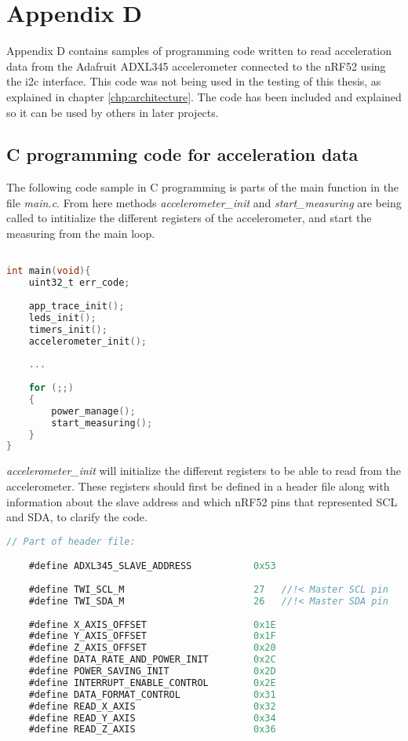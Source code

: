 \chapter{Appendix D}
\label{chp:appendixc}

Appendix D contains samples of programming code written to read acceleration data from the Adafruit ADXL345 accelerometer connected to the nRF52 using the \gls{i2c} interface. This code was not being used in the testing of this thesis, as explained in chapter \ref{chp:architecture}. The code has been included and explained so it can be used by others in later projects.

\section{C programming code for acceleration data}

The following code sample in C programming is parts of the main function in the file \textit{main.c}. From here methods \textit{accelerometer\_init} and \textit{start\_measuring} are being called to intitialize the different registers of the accelerometer, and start the measuring from the main loop. 

\begin{lstlisting}[language=C]

int main(void){
	uint32_t err_code; 
	
	app_trace_init(); 
	leds_init(); 
	timers_init();
	accelerometer_init(); 
	
	...
	
	for (;;)
	{
		power_manage();
		start_measuring();
	}
}
\end{lstlisting}

\newpage

\textit{accelerometer\_init} will initialize the different registers to be able to read from the accelerometer. These registers should first be defined in a header file along with information about the slave address and which \gls{nRF52} pins that represented SCL and SDA, to clarify the code. 

\begin{lstlisting}[language=C]
// Part of header file: 

	#define ADXL345_SLAVE_ADDRESS			0x53
		
    #define TWI_SCL_M						27   //!< Master SCL pin
    #define TWI_SDA_M						26   //!< Master SDA pin
		
	#define X_AXIS_OFFSET					0x1E
	#define Y_AXIS_OFFSET					0x1F
	#define Z_AXIS_OFFSET					0x20
	#define DATA_RATE_AND_POWER_INIT		0x2C
	#define POWER_SAVING_INIT				0x2D
	#define INTERRUPT_ENABLE_CONTROL		0x2E
	#define DATA_FORMAT_CONTROL				0x31
	#define READ_X_AXIS						0x32
	#define READ_Y_AXIS						0x34
	#define READ_Z_AXIS						0x36
\end{lstlisting}

